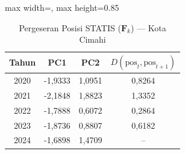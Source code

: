 \begin{table}[H]
\centering
\caption{Pergeseran Posisi STATIS ($\mathbf{F}_k$) --- Kota Cimahi} \label{tab:app2jarak_statis_skor_kota_cimahi}
\begin{adjustbox}{max width=\textwidth, max height=0.85\textheight}
\begin{tabular}{|c|c|c|c|}
\hline
\textbf{Tahun} & \textbf{PC1} & \textbf{PC2} & \textbf{$D(\text{pos}_t, \text{pos}_{t+1})$} \\
\hline
2020 & -1,9333 & 1,0951 & 0,8264 \\
2021 & -2,1848 & 1,8823 & 1,3352 \\
2022 & -1,7888 & 0,6072 & 0,2864 \\
2023 & -1,8736 & 0,8807 & 0,6182 \\
2024 & -1,6898 & 1,4709 & -- \\
\hline
\end{tabular}
\end{adjustbox}
\end{table}